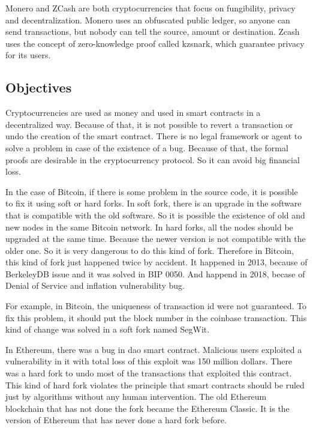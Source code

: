 Monero and ZCash are both cryptocurrencies that focus on fungibility, privacy and decentralization.
Monero uses an obfuscated public ledger, so anyone can send transactions,
but nobody can tell the source, amount or destination.
Zcash uses the concept of zero-knowledge proof called \gls{kzsnark},
which guarantee privacy for its users.

\subsection{Objectives}

Cryptocurrencies are used as money and used in smart contracts in a decentralized way.
Because of that, it is not possible to revert a transaction or undo the creation of the smart contract.
There is no legal framework or agent to solve a problem in case of the existence of a bug.
Because of that, the formal proofs are desirable in the cryptocurrency protocol.
So it can avoid big financial loss.

In the case of Bitcoin, if there is some problem in the source code,
it is possible to fix it using soft or hard forks.
In soft fork, there is an upgrade in the software that is compatible with the old software.
So it is possible the existence of old and new nodes in the same Bitcoin network.
In hard forks, all the nodes should be upgraded at the same time.
Because the newer version is not compatible with the older one.
So it is very dangerous to do this kind of fork.
Therefore in Bitcoin, this kind of fork just happened twice by accident.
It happened in 2013, because of BerkeleyDB issue and it was solved in BIP 0050.
And happend in 2018, becase of Denial of Service and inflation vulnerability bug.

For example, in Bitcoin, the uniqueness of transaction \gls{id} were not guaranteed.
To fix this problem, it should put the block number in the coinbase transaction.
This kind of change was solved in a soft fork named SegWit.

In Ethereum, there was a bug in \gls{dao} smart contract.
Malicious users exploited a vulnerability in it with
total loss of this exploit was 150 million dollars.
There was a hard fork to undo most of the transactions that exploited this contract.
This kind of hard fork violates the principle that smart contracts should be ruled just by
algorithms without any human intervention.
The old Ethereum blockchain that has not done the fork became the Ethereum Classic.
It is the version of Ethereum that has never done a hard fork before.


